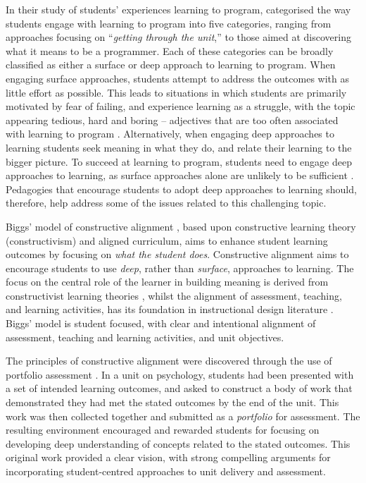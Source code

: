 In their study of students' experiences learning to program, \citet{Bruce:2003} categorised the way students engage with learning to program into five categories, ranging from approaches focusing on ``\emph{getting through the unit},'' to those aimed at discovering what it means to be a programmer. Each of these categories can be broadly classified as either a surface or deep approach to learning \cite{Marton:1976a,Ramsden:1992} to program. When engaging surface approaches, students attempt to address the outcomes with as little effort as possible. This leads to situations in which students are primarily motivated by fear of failing, and experience learning as a struggle, with the topic appearing tedious, hard and boring -- adjectives that are too often associated with learning to program \cite{McGettrick:2005}. Alternatively, when engaging deep approaches to learning students seek meaning in what they do, and relate their learning to the bigger picture. To succeed at learning to program, students need to engage deep approaches to learning, as surface approaches alone are unlikely to be sufficient \cite{Bruce:2003}. Pedagogies that encourage students to adopt deep approaches to learning should, therefore, help address some of the issues related to this challenging topic.

Biggs' model of constructive alignment \cite{Biggs:1996c,Biggs:2007}, based upon constructive learning theory (constructivism) and aligned curriculum, aims to enhance student learning outcomes by focusing on \emph{what the student does}. Constructive alignment aims to encourage students to use \emph{deep}, rather than \emph{surface}, approaches to learning. The focus on the central role of the learner in building meaning is derived from constructivist learning theories \cite{Piaget:1950,Phillips:1995,Steffe:1995,Jonassen:1991,Vrasidas:2000}, whilst the alignment of assessment, teaching, and learning activities, has its foundation in instructional design literature \cite{Tyler:1969,Cohen:1987,Ramsden:1992}. Biggs' model is student focused, with clear and intentional alignment of assessment, teaching and learning activities, and unit objectives.

The principles of constructive alignment were discovered through the use of portfolio assessment \cite{Biggs:1996c}. In a unit on psychology, students had been presented with a set of intended learning outcomes, and asked to construct a body of work that demonstrated they had met the stated outcomes by the end of the unit. This work was then collected together and submitted as a \emph{portfolio} for assessment. The resulting environment encouraged and rewarded students for focusing on developing deep understanding of concepts related to the stated outcomes. This original work provided a clear vision, with strong compelling arguments for incorporating student-centred approaches to unit delivery and assessment.

